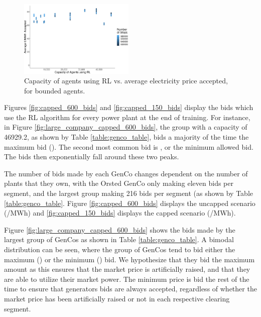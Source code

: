 \documentclass[conference]{IEEEtran}
\begin{document}
\begin{figure}
	\centering
    \includegraphics[width=0.49\textwidth]{figures/results/bounded_results_scatter.pdf}
    \caption{Capacity of agents using RL vs. average electricity price accepted, for bounded agents.}
    \label{fig:bounded_results_scatter}
\end{figure}



Figures \ref{fig:capped_600_bids} and \ref{fig:capped_150_bids} display the bids which use the RL algorithm for every power plant at the end of training. For instance, in Figure \ref{fig:large_company_capped_600_bids}, the group with a capacity of 46929.2, as shown by Table \ref{table:genco_table}, bids a majority of the time the maximum bid (). The second most common bid is , or the minimum allowed bid. The bids then exponentially fall around these two peaks.


The number of bids made by each GenCo changes dependent on the number of plants that they own, with the Orsted GenCo only making eleven bids per segment, and the largest group making 216 bids per segment (as shown by Table \ref{table:genco_table}. Figure \ref{fig:capped_600_bids} displays the uncapped scenario (/MWh) and \ref{fig:capped_150_bids} displays the capped scenario (/MWh).

Figure \ref{fig:large_company_capped_600_bids} shows the bids made by the largest group of GenCos as shown in Table \ref{table:genco_table}. A bimodal distribution can be seen, where the group of GenCos tend to bid either the maximum () or the minimum () bid. We hypothesize that they bid the maximum amount as this ensures that the market price is artificially raised, and that they are able to utilize their market power. The minimum price is bid the rest of the time to ensure that generators bids are always accepted, regardless of whether the market price has been artificially raised or not in each respective clearing segment.
\end{document}
